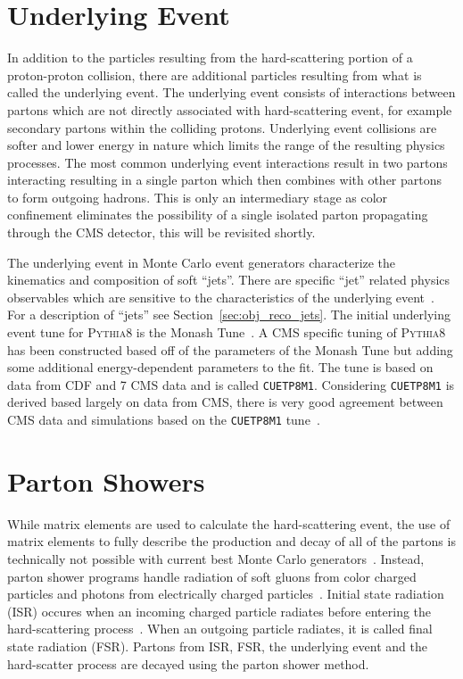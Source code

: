 \section{Underlying Event}
In addition to the particles resulting from the hard-scattering portion of a proton-proton collision,
there are additional particles resulting from what is called the underlying event. 
The underlying event consists of interactions between
partons which are not directly associated with hard-scattering event, for example secondary partons 
within the colliding protons.
Underlying event collisions are softer and lower energy in nature which limits the range of 
the resulting physics processes. 
The most common underlying event interactions result in two partons interacting resulting in a 
single parton which then combines with other partons to form outgoing hadrons. 
This is only an intermediary stage as color confinement eliminates the possibility
of a single isolated parton propagating through the CMS detector, this will be revisited shortly.

The underlying event in 
Monte Carlo event generators characterize the kinematics and composition of soft ``jets''.
There are specific ``jet'' related physics observables which are sensitive to the characteristics of the underlying
event~\cite{Khachatryan:2015pea, Field:cdf2008}. For a description of ``jets'' see Section~\ref{sec:obj_reco_jets}.
The initial underlying event tune for \textsc{Pythia8} is the Monash Tune~\cite{Skands:2014pea}. 
A CMS specific tuning of 
\textsc{Pythia8} has been constructed based off of the parameters of the Monash Tune but adding 
some additional energy-dependent parameters to the fit. The tune is based
on data from CDF and 7 \TeV CMS data and is called \texttt{CUETP8M1}.
Considering \texttt{CUETP8M1} is derived based largely on data from
CMS, there is very good agreement between CMS data and simulations based on the
\texttt{CUETP8M1} tune~\cite{Khachatryan:2015pea}. 



\section{Parton Showers}
While matrix elements are used to calculate the hard-scattering event, 
the use of matrix elements to fully describe the production and decay of all of the
partons is technically not possible with current best Monte Carlo generators~\cite{PhysRevD.94.074005}. 
Instead, parton shower programs handle radiation of soft gluons from 
color charged particles and photons from electrically charged particles~\cite{Sjostrand2005}.
Initial state radiation (ISR) occures when an incoming charged particle radiates before entering the 
hard-scattering process~\cite{PDG}. When an outgoing particle radiates, it is called
final state radiation (FSR).
Partons from ISR, FSR, the underlying event and the hard-scatter 
process are decayed using the parton shower method. 

